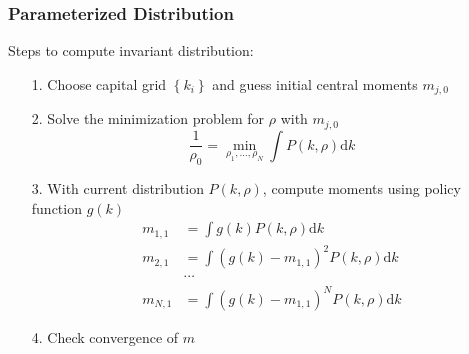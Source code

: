 \documentclass[aspectratio=169, 11pt]{beamer}
\begin{document}
\begin{frame}
\frametitle{Parameterized Distribution}
  Steps to compute invariant distribution:
  \begin{itemize}
    \item[1.] Choose capital grid $\left\{ k_{i}\right\}$ and guess initial central moments $m_{j,0}$
    \item[2.] Solve the minimization problem for $\rho$ with $m_{j,0}$
    \[
      \frac{1}{\rho_{0}}=\min_{\rho_{1},\ldots,\rho_{N}}\int P\left(k,\rho\right)\mathrm{d}k
    \]
    \item[3.] With current distribution $P\left(k,\rho\right)$, compute moments using policy function $g(k)$
    \begin{align*}
      m_{1,1} & =\int g\left(k\right)P\left(k,\rho\right)\mathrm{d}k\\
      m_{2,1} & =\int\left(g\left(k\right)-m_{1,1}\right)^{2}P\left(k,\rho\right)\mathrm{d}k\\
      & \cdots\\
      m_{N,1} & =\int\left(g\left(k\right)-m_{1,1}\right)^{N}P\left(k,\rho\right)\mathrm{d}k
    \end{align*}
    \item[4.] Check convergence of $m$
  \end{itemize}
\end{frame}
\end{document}

